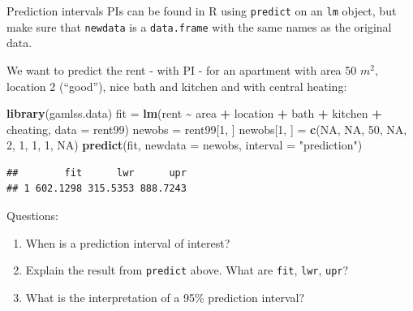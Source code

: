 \documentclass[
  ignorenonframetext,
]{beamer}
\newenvironment{Shaded}{\begin{snugshade}}{\end{snugshade}}
\newcommand{\AttributeTok}[1]{\textcolor[rgb]{0.13,0.29,0.53}{#1}}
\newcommand{\ConstantTok}[1]{\textcolor[rgb]{0.56,0.35,0.01}{#1}}
\newcommand{\DecValTok}[1]{\textcolor[rgb]{0.00,0.00,0.81}{#1}}
\newcommand{\FunctionTok}[1]{\textcolor[rgb]{0.13,0.29,0.53}{\textbf{#1}}}
\newcommand{\NormalTok}[1]{#1}
\newcommand{\OtherTok}[1]{\textcolor[rgb]{0.56,0.35,0.01}{#1}}
\newcommand{\SpecialCharTok}[1]{\textcolor[rgb]{0.81,0.36,0.00}{\textbf{#1}}}
\newcommand{\StringTok}[1]{\textcolor[rgb]{0.31,0.60,0.02}{#1}}
\begin{document}
\begin{frame}[fragile]{Prediction intervals}
\label{prediction-intervals-4}
PIs can be found in R using \texttt{predict} on an \texttt{lm} object,
but make sure that \texttt{newdata} is a \texttt{data.frame} with the
same names as the original data.

We want to predict the rent - with PI - for an apartment with area 50
\(m^2\), location 2 (``good''), nice bath and kitchen and with central
heating:

\begin{Shaded}
\begin{Highlighting}[]
\FunctionTok{library}\NormalTok{(gamlss.data)}
\NormalTok{fit }\OtherTok{=} \FunctionTok{lm}\NormalTok{(rent }\SpecialCharTok{\textasciitilde{}}\NormalTok{ area }\SpecialCharTok{+}\NormalTok{ location }\SpecialCharTok{+}\NormalTok{ bath }\SpecialCharTok{+}\NormalTok{ kitchen }\SpecialCharTok{+}\NormalTok{ cheating, }\AttributeTok{data =}\NormalTok{ rent99)}
\NormalTok{newobs }\OtherTok{=}\NormalTok{ rent99[}\DecValTok{1}\NormalTok{, ]}
\NormalTok{newobs[}\DecValTok{1}\NormalTok{, ] }\OtherTok{=} \FunctionTok{c}\NormalTok{(}\ConstantTok{NA}\NormalTok{, }\ConstantTok{NA}\NormalTok{, }\DecValTok{50}\NormalTok{, }\ConstantTok{NA}\NormalTok{, }\DecValTok{2}\NormalTok{, }\DecValTok{1}\NormalTok{, }\DecValTok{1}\NormalTok{, }\DecValTok{1}\NormalTok{, }\ConstantTok{NA}\NormalTok{)}
\FunctionTok{predict}\NormalTok{(fit, }\AttributeTok{newdata =}\NormalTok{ newobs, }\AttributeTok{interval =} \StringTok{"prediction"}\NormalTok{)}
\end{Highlighting}
\end{Shaded}

\begin{verbatim}
##        fit      lwr      upr
## 1 602.1298 315.5353 888.7243
\end{verbatim}
\end{frame}

\begin{frame}[fragile]{Questions:}
\label{questions}
\begin{enumerate}
\item
  {When is a prediction interval of interest? }
\item
  {Explain the result from \texttt{predict} above. What are
  \texttt{fit}, \texttt{lwr}, \texttt{upr}?}
\item
  {What is the interpretation of a 95\% prediction interval? }
\end{enumerate}
\end{frame}
\end{document}
